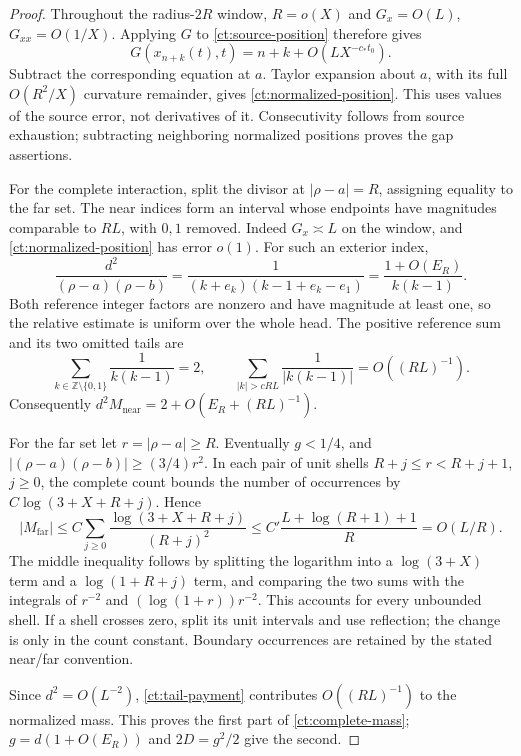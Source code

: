 \begin{proof}
Throughout the radius-$2R$ window, $R=o(X)$ and
$G_x=O(L)$, $G_{xx}=O(1/X)$. Applying $G$ to
\eqref{ct:source-position} therefore gives
\[
 G(x_{n+k}(t),t)=n+k+O(LX^{-c_*t_0}).
\]
Subtract the corresponding equation at $a$. Taylor expansion about
$a$, with its full $O(R^2/X)$ curvature remainder, gives
\eqref{ct:normalized-position}. This uses values of the source error,
not derivatives of it. Consecutivity follows from source exhaustion;
subtracting neighboring normalized positions proves the gap assertions.

For the complete interaction, split the divisor at $|\rho-a|=R$,
assigning equality to the far set. The near indices form an interval
whose endpoints have magnitudes comparable to $RL$, with $0,1$ removed.
Indeed $G_x\asymp L$ on the window, and
\eqref{ct:normalized-position} has error $o(1)$. For such an exterior
index,
\begin{equation}
 \frac{d^2}{(\rho-a)(\rho-b)}
 =\frac1{(k+e_k)(k-1+e_k-e_1)}
 =\frac{1+O(E_R)}{k(k-1)}.
 \label{ct:head-summand}
\end{equation}
Both reference integer factors are nonzero and have magnitude at least
one, so the relative estimate is uniform over the whole head. The
positive reference sum and its two omitted tails are
\[
 \sum_{k\in\mathbb Z\setminus\{0,1\}}\frac1{k(k-1)}=2,
 \qquad
 \sum_{|k|>cRL}\frac1{|k(k-1)|}=O((RL)^{-1}).
\]
Consequently $d^2M_{\mathrm{near}}=2+O(E_R+(RL)^{-1})$.

For the far set let $r=|\rho-a|\ge R$. Eventually $g<1/4$, and
$|(\rho-a)(\rho-b)|\ge(3/4)r^2$. In each pair of unit shells
$R+j\le r<R+j+1$, $j\ge0$, the complete count bounds the number
of occurrences by $C\log(3+X+R+j)$. Hence
\begin{equation}
 |M_{\mathrm{far}}|
 \le C\sum_{j\ge0}
       \frac{\log(3+X+R+j)}{(R+j)^2}
 \le C'\frac{L+\log(R+1)+1}{R}
 =O(L/R).
 \label{ct:tail-payment}
\end{equation}
The middle inequality follows by splitting the logarithm into a
$\log(3+X)$ term and a $\log(1+R+j)$ term, and comparing the two
sums with the integrals of $r^{-2}$ and $(\log(1+r))r^{-2}$.
This accounts for every unbounded shell. If a shell crosses zero,
split its unit intervals and use reflection; the change is only in
the count constant. Boundary occurrences are retained by the stated
near/far convention.

Since $d^2=O(L^{-2})$, \eqref{ct:tail-payment} contributes
$O((RL)^{-1})$ to the normalized mass. This proves the first part
of \eqref{ct:complete-mass}; $g=d(1+O(E_R))$ and $2D=g^2/2$
give the second.
\end{proof}


